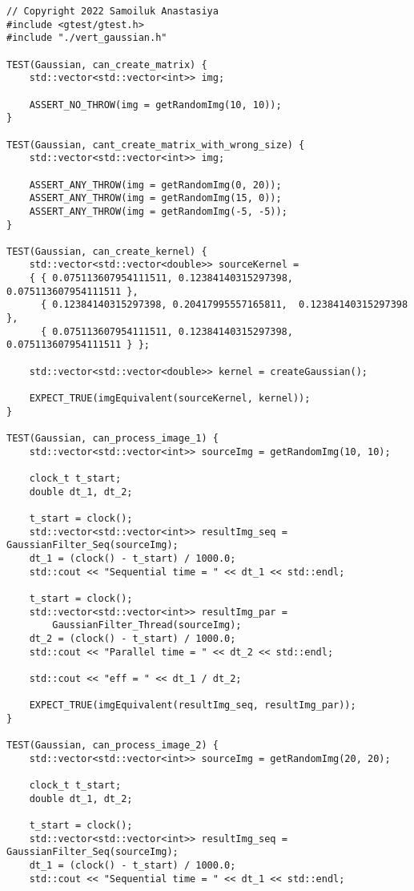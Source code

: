 \documentclass{report}
\begin{document}
\begin{lstlisting}
// Copyright 2022 Samoiluk Anastasiya
#include <gtest/gtest.h>
#include "./vert_gaussian.h"

TEST(Gaussian, can_create_matrix) {
    std::vector<std::vector<int>> img;

    ASSERT_NO_THROW(img = getRandomImg(10, 10));
}

TEST(Gaussian, cant_create_matrix_with_wrong_size) {
    std::vector<std::vector<int>> img;

    ASSERT_ANY_THROW(img = getRandomImg(0, 20));
    ASSERT_ANY_THROW(img = getRandomImg(15, 0));
    ASSERT_ANY_THROW(img = getRandomImg(-5, -5));
}

TEST(Gaussian, can_create_kernel) {
    std::vector<std::vector<double>> sourceKernel =
    { { 0.075113607954111511, 0.12384140315297398, 0.075113607954111511 },
      { 0.12384140315297398, 0.20417995557165811,  0.12384140315297398 },
      { 0.075113607954111511, 0.12384140315297398, 0.075113607954111511 } };

    std::vector<std::vector<double>> kernel = createGaussian();

    EXPECT_TRUE(imgEquivalent(sourceKernel, kernel));
}

TEST(Gaussian, can_process_image_1) {
    std::vector<std::vector<int>> sourceImg = getRandomImg(10, 10);

    clock_t t_start;
    double dt_1, dt_2;

    t_start = clock();
    std::vector<std::vector<int>> resultImg_seq = GaussianFilter_Seq(sourceImg);
    dt_1 = (clock() - t_start) / 1000.0;
    std::cout << "Sequential time = " << dt_1 << std::endl;

    t_start = clock();
    std::vector<std::vector<int>> resultImg_par =
        GaussianFilter_Thread(sourceImg);
    dt_2 = (clock() - t_start) / 1000.0;
    std::cout << "Parallel time = " << dt_2 << std::endl;

    std::cout << "eff = " << dt_1 / dt_2;

    EXPECT_TRUE(imgEquivalent(resultImg_seq, resultImg_par));
}

TEST(Gaussian, can_process_image_2) {
    std::vector<std::vector<int>> sourceImg = getRandomImg(20, 20);

    clock_t t_start;
    double dt_1, dt_2;

    t_start = clock();
    std::vector<std::vector<int>> resultImg_seq = GaussianFilter_Seq(sourceImg);
    dt_1 = (clock() - t_start) / 1000.0;
    std::cout << "Sequential time = " << dt_1 << std::endl;


\end{lstlisting}
\end{document}
